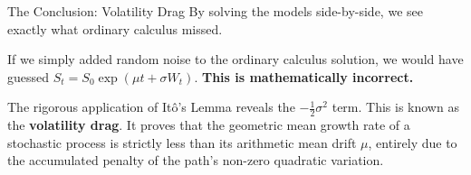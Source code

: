 \documentclass{beamer}
\begin{document}
\begin{frame}{The Conclusion: Volatility Drag}
By solving the models side-by-side, we see exactly what ordinary calculus missed. 

\vspace{0.5cm}
If we simply added random noise to the ordinary calculus solution, we would have guessed $S_t = S_0 \exp(\mu t + \sigma W_t)$. \textbf{This is mathematically incorrect.}

\vspace{0.5cm}
The rigorous application of It\^o's Lemma reveals the $-\frac{1}{2}\sigma^2$ term. This is known as the \textbf{volatility drag}. It proves that the geometric mean growth rate of a stochastic process is strictly less than its arithmetic mean drift $\mu$, entirely due to the accumulated penalty of the path's non-zero quadratic variation.
\end{frame}
\end{document}

